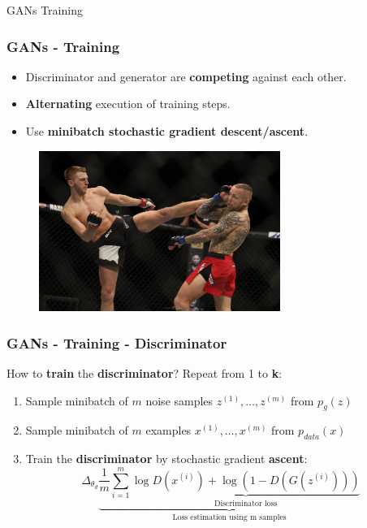 \documentclass{beamer}
\begin{document}
\begin{frame}[standout]
GANs Training
\end{frame}

\begin{frame}
\frametitle{GANs - Training}
\begin{itemize}
	\item Discriminator and generator are \textbf{competing} against each other.
	\item \textbf{Alternating} execution of training steps.
	\item Use \textbf{minibatch stochastic gradient descent/ascent}.
\end{itemize}
\begin{figure}
	\centering
	\includegraphics[width=0.7\textwidth]{images/fight.jpg}
\end{figure}

\end{frame}

\begin{frame}
\frametitle{GANs - Training - Discriminator}
How to \textbf{train} the \textbf{discriminator}? \newline
	Repeat from 1 to \textbf{k}:
	\begin{enumerate}
		\item Sample minibatch of $m$ noise samples ${z^{(1)},\dots,z^{(m)}}$ from $p_g(z)$
		\item Sample minibatch of $m$ examples ${x^{(1)},\dots,x^{(m)}}$ from $p_{data}(x)$
		\item Train the \textbf{discriminator} by stochastic gradient \textbf{ascent}:
	$$ \Delta_{\theta_d} \underbrace{\frac{1}{m} \sum_{i=1}^{m} \underbrace{\log D(x^{(i)}) + \log(1 - D(G(z^{(i)})))}_{\text{Discriminator loss}}}_{\text{Loss estimation using m samples}} $$
	\end{enumerate}
\end{frame}
\end{document}
